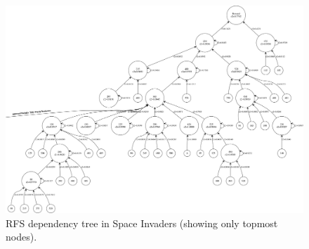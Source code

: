 \begin{figure}
    \includegraphics[width=\textwidth]{pictures/experiments/rfs_tree_top_pong}
    \centering
    \caption[RFS dependency tree in Space Invaders]{RFS dependency tree in Space 
	     Invaders (showing only topmost nodes).}
    \label{f:rfs_tree_space_invaders}
\end{figure}
%


